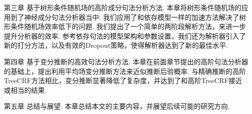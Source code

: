 第三章 基于树形条件随机场的高阶成分句法分析方法.
本章将树形条件随机场的应用到了神经成分句法分析器当中.
我们应用了和依存模型一样的加速方法解决了树形条件随机场效率低下的问题.
我们提出了一个简单的两阶段解析方法，来进一步提升分析器的效率.
参考依存句法的模型架构和参数设置，我们还为解析器引入了新的打分方法，以及有效的Dropout策略，使得解析器达到了新的最佳水平.

第四章 基于变分推断的高效句法分析方法.
本章在前面章节提出的高阶句法分析器的基础上，提出利用平均场变分推断方法来近似推断后验概率.
与精确推断的高阶TreeCRF方法相比，变分推断显著降低了复杂度，并达到了和高阶TreeCRF接近或相当的结果.

第五章 总结与展望.
本章总结本文的主要内容，并展望后续可能的研究方向.
